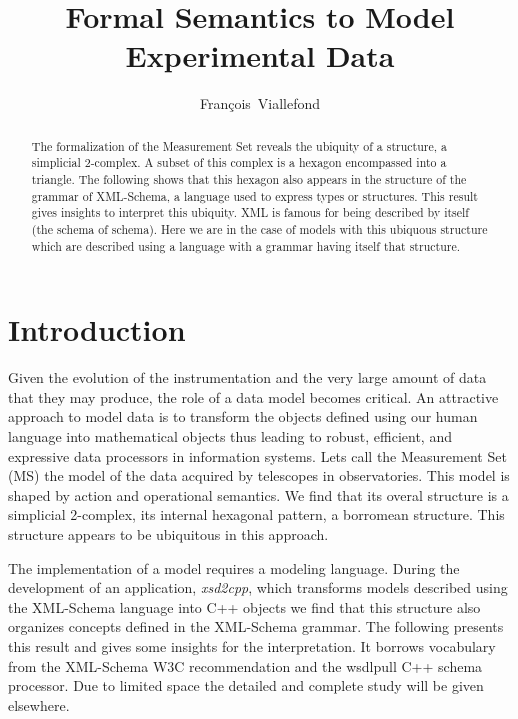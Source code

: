 
\resetcounters


\title{Formal Semantics to Model Experimental Data}
\author{Fran\c{c}ois~Viallefond
}


\begin{abstract}
The formalization of the Measurement Set reveals the ubiquity of a 
structure, a simplicial 2-complex. A subset of this complex is 
a hexagon encompassed into a triangle.
The following shows that this hexagon also appears in the structure 
of the grammar of XML-Schema, a language used to express types or structures.
This result gives insights to interpret this ubiquity.
XML is famous for being described by itself (the schema of schema).
Here we are in the case of models with this ubiquous structure 
which are described using a language with a grammar having itself 
that structure.
\end{abstract}

\section{Introduction}
Given the evolution of the instrumentation and the very large amount
of data that they may produce, the role of a data model becomes critical.
An attractive approach to model data is to transform the objects defined
using our human language into mathematical objects thus leading
to robust, efficient, and expressive data processors
in information systems. Lets call the Measurement Set (MS) the model
of the data acquired by telescopes in observatories. This model
is shaped by action and operational semantics. We find that its
overal structure is a simplicial 2-complex, its internal hexagonal pattern,
a borromean structure.
This structure appears to be ubiquitous in this approach.

The implementation of a model requires a modeling language.
During the development of an application, {\it xsd2cpp}, which transforms 
models described using the XML-Schema language into C++ objects we find that 
this structure also organizes concepts defined in the XML-Schema grammar. 
The following presents this result and gives some insights for the interpretation.
It borrows vocabulary from the XML-Schema W3C recommendation and the wsdlpull C++
schema processor. 
Due to limited space the detailed and complete study will be given elsewhere.

